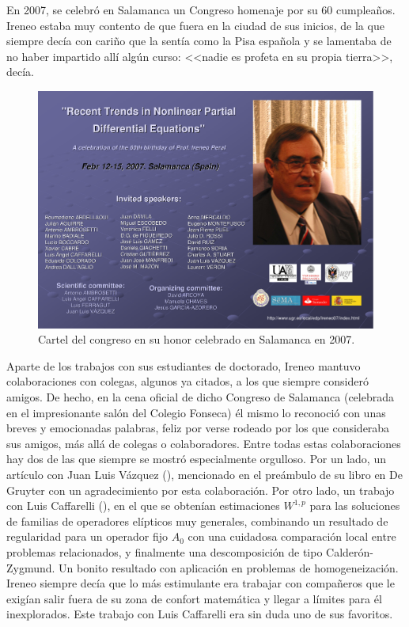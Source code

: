 En  2007, se celebr\'o en Salamanca un Congreso homenaje por su 60 cumplea\~{n}os. Ireneo estaba muy contento de que fuera en la ciudad de sus inicios, de la que siempre dec\'ia con cari\~{n}o que la sent\'ia como la Pisa espa\~{n}ola y se lamentaba de no haber impartido all\'i alg\'un curso: <<nadie es profeta en su propia tierra>>, dec\'ia.


\begin{figure}%
\begin{center}
\includegraphics[width=0.9\linewidth]{IP_foto_Salamanca2007.pdf}
\caption{Cartel  del congreso en su honor celebrado en Salamanca en 2007.}
\end{center}
\end{figure}


Aparte de los trabajos con sus estudiantes de doctorado, Ireneo mantuvo colaboraciones con colegas, {algunos ya citados}, a los que siempre consider\'o amigos. De hecho, en la cena oficial de dicho Congreso de Salamanca (celebrada en el impresionante sal\'on del Colegio Fonseca) \'el mismo lo reconoci\'o con unas breves y emocionadas palabras, feliz por verse rodeado por los que consideraba sus amigos, m\'as all\'a de colegas o colaboradores. Entre todas estas colaboraciones hay dos de las que siempre se mostr\'o especialmente orgulloso. Por un lado, un art\'iculo con Juan Luis V\'azquez {(\cite{Peral-Vazquez})}, mencionado en el pre\'ambulo de su libro en De Gruyter con un agradecimiento por esta colaboraci\'on. Por otro lado, un trabajo con Luis Caffarelli {(\cite{Caffarelli-Peral})}, en el que se
obten\'ian estimaciones $W^{1,p}$ para las soluciones de familias de operadores el\'ipticos muy generales, combinando un resultado de regularidad para un operador fijo $ A_0$ con una cuidadosa comparaci\'on local entre  problemas relacionados, y finalmente  una descomposici\'on de tipo Calder\'on-Zygmund. Un bonito resultado con aplicaci\'on en problemas de homogeneizaci\'on. Ireneo siempre dec\'ia que lo m\'as estimulante era trabajar con compa\~neros que le exig\'ian salir fuera de su zona de confort matem\'atica y llegar a l\'imites para \'el inexplorados. Este trabajo con Luis Caffarelli era sin duda uno de sus favoritos.






